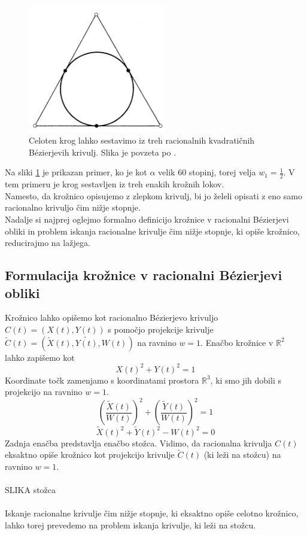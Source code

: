 \documentclass[a4paper,11pt]{article}
\theoremstyle{definition}
\theoremstyle{plain}
\begin{document}
\begin{figure}[ht!]\label{slika:krogpodelih}
    \centering
    \includegraphics[width=60mm]{krog_po_delih.png}
    \caption{Celoten krog lahko sestavimo iz treh racionalnih kvadratičnih B\'ezierjevih krivulj. Slika je povzeta po \cite{farin}.}
\end{figure}
\noindent
Na sliki \ref{slika:krogpodelih} je prikazan primer, ko je kot $\alpha$ velik 60 stopinj, torej velja $w_1 = \frac{1}{2}$. V tem primeru je krog sestavljen iz treh enakih krožnih lokov.
\\

Namesto, da krožnico opisujemo z zlepkom krivulj, bi jo želeli opisati z eno samo racionalno krivuljo čim nižje stopnje.
\\
Nadalje si najprej oglejmo formalno definicijo krožnice v racionalni B\'ezierjevi obliki in problem iskanja racionalne krivulje čim nižje stopnje, ki opiše krožnico, reducirajmo na lažjega.

\subsection{Formulacija krožnice v racionalni B\'ezierjevi obliki}
Krožnico lahko opišemo kot racionalno B\'ezierjevo krivuljo $C(t)=(X(t),Y(t))$ s pomočjo projekcije krivulje $\tilde{C}(t)=(\tilde{X}(t), \tilde{Y(t)}, W(t))$ na ravnino $w=1$. 
Enačbo krožnice v $\mathbb{R}^2$ lahko zapišemo kot
$$X(t)^2+Y(t)^2=1$$
Koordinate točk zamenjamo s koordinatami prostora $\mathbb{R}^3$, ki smo jih dobili s projekcijo na ravnino $w=1$.
$$\left(\frac{\tilde{X}(t)}{W(t)}\right)^2+\left(\frac{\tilde{Y}(t)}{W(t)}\right)^2=1$$
$$\tilde{X}(t)^2+\tilde{Y}(t)^2-W(t)^2=0$$
Zadnja enačba predstavlja enačbo stožca. Vidimo, da racionalna krivulja $C(t)$ eksaktno opiše krožnico kot projekcijo krivulje $\tilde{C}(t)$ (ki leži na stožcu) na ravnino $w = 1$.
\\
\\
SLIKA stožca
\\
\\
Iskanje racionalne krivulje čim nižje stopnje, ki eksaktno opiše celotno krožnico, lahko torej prevedemo na problem iskanja krivulje, ki leži na stožcu. 
\end{document}
